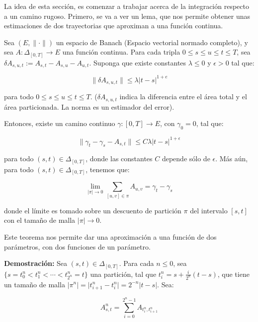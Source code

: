
La idea de esta sección, es comenzar a trabajar acerca de la integración respecto a un camino rugoso. Primero, se va a ver un lema, que nos permite obtener unas estimaciones de dos trayectorias que aproximan a una función continua.

\begin{theorem}

	Sea $(E, \lVert \cdot \rVert)$ un espacio de Banach (Espacio vectorial normado completo), y sea $A: \Delta_{[0,T]} \rightarrow E$ una función continua. Para cada tripla $0 \leq s \leq u \leq t \leq T$, sea $\delta A_{s,u,t} := A_{s,t} - A_{s,u} - A_{u,t}$. Suponga que existe constantes $\lambda \leq 0$ y $\epsilon > 0$ tal que:

	\[
			\lVert \delta A_{s,u,t} \rVert \leq \lambda \lvert t - s \rvert^{1 + e}
	\]

	para todo $0 \leq s \leq u \leq t \leq T$. ($\delta A_{s,u,t}$ indica la diferencia entre el área total y el área particionada. La norma es un estimador del error).

	Entonces, existe un camino continuo $\gamma: [0,T] \rightarrow E$, con $ \gamma_0 = 0$, tal que:

	\[
		\lVert \gamma_t - \gamma_s - A_{s,t} \rVert \leq C \lambda \lvert t - s \rvert^{1 + \epsilon}
	\]

	para todo $(s,t) \in \Delta_{[0,T]}$, donde las constantes $C$ depende sólo de $\epsilon$. Más aún, para todo $(s,t) \in \Delta_{[0,T]}$, tenemos que:

	\[
		\lim_{\lvert \pi \rvert \rightarrow 0} \sum_{  [u,v] \in \pi } A_{u,v} = \gamma_t - \gamma_s 
	\]

	donde el límite es tomado sobre un descuento de partición $\pi$ del intervalo $[s,t]$ con el tamaño de malla $\lvert \pi \rvert \rightarrow 0$.

\end{theorem}

Este teorema nos permite dar una aproximación a una función de dos parámetros, con dos funciones de un parámetro.

\textbf{Demostración:} Sea $(s,t) \in \Delta_{[0,T]}$. Para cada $n \leq 0$, sea $\{ s = t_0^n < t_1^n < \cdots < t_{2^n}^n  = t  \}$ una partición, tal que $t_i^n = s + \frac{i}{2^n}(t - s)$, que tiene un tamaño de malla $\lvert \pi^n \rvert = \lvert t_{i + 1}^n - t_i^n \rvert = 2^{-n} \lvert t - s \rvert $. Sea:

\[
	A_{s,t}^n = \sum_{i = 0}^{2^n - 1} A_{ t_i^n, t_{i+1}^n }
\]

